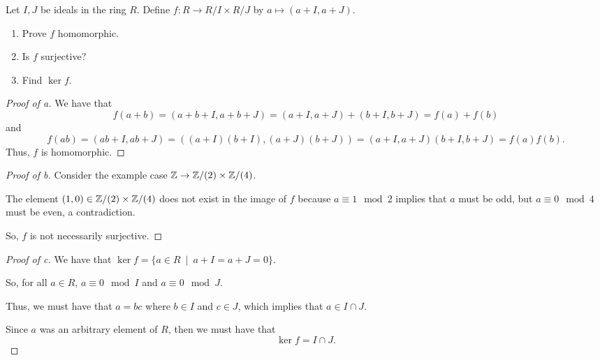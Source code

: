 \documentclass[../hw8]{subfiles}
\begin{document}
\begin{problem}
Let $I,J$ be ideals in the ring $R$.
Define $f:R \to  R / I \times  R / J$ by $a \mapsto (a+I,a+J)$.
\begin{enumerate}[label=\alph*)]
	\item Prove $f$ homomorphic.
	\item Is $f$ surjective?
	\item Find $\ker{f} $.
\end{enumerate}
\end{problem}
\begin{proof}[Proof of a]
	We have that \[
		f(a+b)=(a+b+I,a+b+J)=(a+I,a+J)+(b+I,b+J)=f(a)+f(b)
	\] and \[
		f(ab)=(ab+I,ab+J)=((a+I)(b+I),(a+J)(b+J))=(a+I,a+J)(b+I,b+J)=f(a)f(b)
		.\]  Thus, $f$ is homomorphic.
\end{proof}
\begin{proof}[Proof of b]
	Consider the example case $\mathbb{Z} \to  \mathbb{Z} / (2) \times  \mathbb{Z} / (4)$.

	The element $(1,0) \in \mathbb{Z} / (2) \times \mathbb{Z} / (4)$  does not exist in the image of $f$ because
	$a\equiv 1 \mod{2}$ implies that $a$ must be odd, but $a\equiv 0 \mod{4}$ must be even, a contradiction.

	So, $f$ is not necessarily surjective.
\end{proof}
\begin{proof}[Proof of c]
	We have that $\ker{f}=\{a\in R\ \mid\ a+I=a+J=0\}$.

	So, for all $a\in R$, $a\equiv 0 \mod{I}$ and $a\equiv 0 \mod{J}$.

	Thus, we must have that $a=bc$ where  $b\in I$ and $c\in J$,
	which implies that $a\in I \cap J$.

	Since $a$ was an arbitrary element of $R$, then we must have that \[
		\ker{f} = I\cap J
		.\]
\end{proof}
\end{document}
